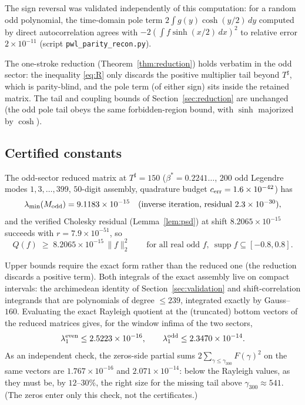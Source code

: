 ﻿\documentclass[11pt]{article}
\newcommand{\supp}{\operatorname{supp}}
\newcommand{\lammin}{\lambda_{\min}}
\newcommand{\Tsharp}{T^{\sharp}}
\begin{document}
The sign reversal was validated independently of this computation: for
a random odd polynomial, the time-domain pole term
$2\int g(y)\cosh(y/2)\,dy$ computed by direct autocorrelation agrees
with $-2(\int f\sinh(x/2)\,dx)^2$ to relative error $2\times10^{-11}$
(script \texttt{pwl\_parity\_recon.py}).

The one-stroke reduction (Theorem~\ref{thm:reduction}) holds verbatim
in the odd sector: the inequality \eqref{eq:R} only discards the
positive multiplier tail beyond $\Tsharp$, which is parity-blind, and
the pole term (of either sign) sits inside the retained matrix.  The
tail and coupling bounds of Section~\ref{sec:reduction} are unchanged
(the odd pole tail obeys the same forbidden-region bound, with $\sinh$
majorized by $\cosh$).

\subsection{Certified constants}

The odd-sector reduced matrix at $\Tsharp=150$
($\beta^*=0.2241\ldots$, $200$ odd Legendre modes $1,3,\dots,399$,
$50$-digit assembly, quadrature budget
$c_{\rm err}=1.6\times10^{-42}$) has
\[
\lammin(M_{\rm odd})=9.1183\times10^{-15}
\quad\text{(inverse iteration, residual }2.3\times10^{-30}),
\]
and the verified Cholesky residual (Lemma~\ref{lem:psd}) at shift
$8.2065\times10^{-15}$ succeeds with $r=7.9\times10^{-51}$, so
\begin{equation}\label{eq:oddlower}
Q(f)\;\ge\;8.2065\times10^{-15}\,\|f\|_2^2
\qquad\text{for all real odd }f,\ \supp f\subseteq[-0.8,0.8].
\end{equation}

Upper bounds require the exact form rather than the reduced one (the
reduction discards a positive term).  Both integrals of the exact
assembly live on compact intervals: the archimedean identity of
Section~\ref{sec:validation} and shift-correlation integrands that are
polynomials of degree $\le239$, integrated exactly by Gauss--$160$.
Evaluating the exact Rayleigh quotient at the (truncated) bottom
vectors of the reduced matrices gives, for the window infima of the
two sectors,
\[
\lambda_1^{\rm even}\le2.5223\times10^{-16},
\qquad
\lambda_1^{\rm odd}\le2.3470\times10^{-14}.
\]
As an independent check, the zeros-side partial sums
$2\sum_{\gamma\le\gamma_{300}}F(\gamma)^2$ on the same vectors are
$1.767\times10^{-16}$ and $2.071\times10^{-14}$: below the Rayleigh
values, as they must be, by $12$--$30\%$, the right size for the
missing tail above $\gamma_{300}\approx541$.  (The zeros enter only
this check, not the certificates.)
\end{document}
